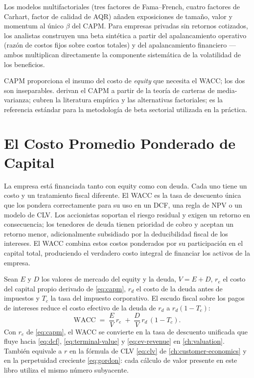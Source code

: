 Los modelos multifactoriales (tres factores de Fama--French, cuatro factores de Carhart, factor de
calidad de AQR) añaden exposiciones de tamaño, valor y momentum al único \(\beta\) del CAPM. Para
empresas privadas sin retornos cotizados, los analistas construyen una beta sintética a partir del
apalancamiento operativo (razón de costos fijos sobre costos totales) y del apalancamiento financiero
--- ambos multiplican directamente la componente sistemática de la volatilidad de los beneficios.

CAPM proporciona el insumo del costo de \emph{equity} que necesita el WACC; los dos son inseparables.
\textcite{brealey2020} derivan el CAPM a partir de la teoría de carteras de media-varianza;
\textcite{ross2022} cubren la literatura empírica y las alternativas factoriales;
\textcite{berk6thcorporate} es la referencia estándar para la metodología de beta sectorial
utilizada en la práctica.

\section{El Costo Promedio Ponderado de Capital}\label{sec:wacc}

La empresa está financiada tanto con equity como con deuda. Cada uno tiene un costo y un tratamiento
fiscal diferente. El WACC es la tasa de descuento única que los pondera correctamente para su uso en un
DCF, una regla de NPV o un modelo de CLV. Los accionistas soportan el riesgo residual y exigen un
retorno en consecuencia; los tenedores de deuda tienen prioridad de cobro y aceptan un retorno menor,
adicionalmente subsidiado por la deducibilidad fiscal de los intereses. El WACC combina estos costos
ponderados por su participación en el capital total, produciendo el verdadero costo integral de financiar
los activos de la empresa.

Sean \(E\) y \(D\) los valores de mercado del equity y la deuda, \(V=E+D\), \(r_e\) el costo
del capital propio derivado de \cref{eq:capm}, \(r_d\) el costo de la deuda antes de impuestos y
\(T_c\) la tasa del impuesto corporativo. El escudo fiscal sobre los pagos de intereses reduce el
costo efectivo de la deuda de \(r_d\) a \(r_d(1-T_c)\):
\begin{equation}\label{eq:wacc}
  \mathrm{WACC} \;=\; \frac{E}{V}\,r_e \;+\; \frac{D}{V}\,r_d\,(1-T_c).
\end{equation}
Con \(r_e\) de \cref{eq:capm}, el WACC se convierte en la tasa de descuento unificada que fluye hacia
\cref{eq:dcf}, \cref{eq:terminal-value} y \cref{eq:ev-revenue} en \cref{ch:valuation}.
También equivale a \(r\) en la fórmula de CLV \cref{eq:clv} de \cref{ch:customer-economics} y
en la perpetuidad creciente \cref{eq:gordon}: cada cálculo de valor presente en este libro
utiliza el mismo número subyacente.

